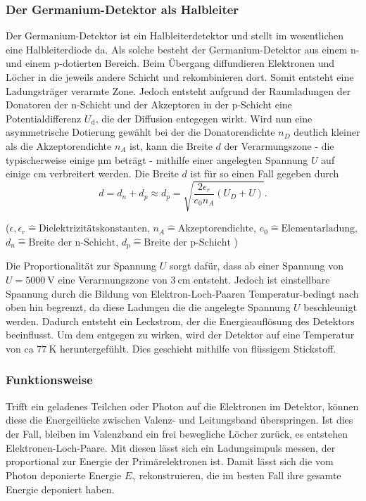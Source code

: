 \subsubsection{Der Germanium-Detektor als Halbleiter}
Der Germanium-Detektor ist ein Halbleiterdetektor und stellt im wesentlichen eine Halbleiterdiode da. Als solche besteht der Germanium-Detektor aus einem n- und einem p-dotierten Bereich. Beim Übergang diffundieren Elektronen und Löcher in die jeweils andere Schicht und rekombinieren dort. Somit entsteht eine Ladungsträger verarmte Zone. Jedoch entsteht aufgrund der Raumladungen der Donatoren der n-Schicht und der Akzeptoren in der p-Schicht eine Potentialdifferenz $U_\text{d}$, die der Diffusion entegegen wirkt. Wird nun eine asymmetrische Dotierung gewählt bei der die Donatorendichte $n_D$ deutlich kleiner als die Akzeptorendichte $n_A$ ist, kann die Breite $d$ der Verarmungszone - die typischerweise einige µm beträgt - mithilfe einer angelegten Spannung $U$ auf einige cm verbreitert werden. Die Breite $d$ ist für so einen Fall gegeben durch
\begin{equation}
 d = d_n + d_p \approx d_p = \sqrt{\frac{2 \epsilon_r }{e_0 n_A}(U_D + U)}.
\end{equation}
\begin{center}
\tiny{($ \epsilon, \epsilon_r \hat{=} \text{Dielektrizitätskonstanten} $, $ n_A \hat{=} \text{Akzeptorendichte} $, $e_0 \hat{=} \text{Elementarladung} $, $d_n \hat{=} \text{Breite der n-Schicht}$, $d_p \hat{=} \text{Breite der p-Schicht}$ )}
\end{center}
Die Proportionalität zur Spannung $U$ sorgt dafür, dass ab einer Spannung von $U = \SI{5000}{\volt}$ eine Verarmungszone von  $\SI{3}{\centi \meter}$ entsteht. Jedoch ist einstellbare Spannung durch die Bildung von Elektron-Loch-Paaren Temperatur-bedingt nach oben hin begrenzt, da diese Ladungen die die angelegte Spannung $U$ beschleunigt werden. Dadurch entsteht ein Leckstrom, der die Energieauflösung des Detektors beeinflusst. Um dem entgegen zu wirken, wird der Detektor auf eine Temperatur von ca $\SI{77}{\kelvin}$ heruntergefühlt. Dies geschieht mithilfe von flüssigem Stickstoff. \\

\subsubsection{Funktionsweise}
Trifft ein geladenes Teilchen oder Photon auf die Elektronen im Detektor, können diese die Energeilücke zwischen Valenz- und Leitungsband überspringen. Ist dies der Fall, bleiben im Valenzband ein frei bewegliche Löcher zurück, es entstehen Elektronen-Loch-Paare. Mit diesen lässt sich ein Ladungsimpuls messen, der proportional zur Energie der Primärelektronen ist. Damit lässt sich die vom Photon deponierte Energie $E_\gamma$ rekonstruieren, die im besten Fall ihre gesamte Energie deponiert haben.

